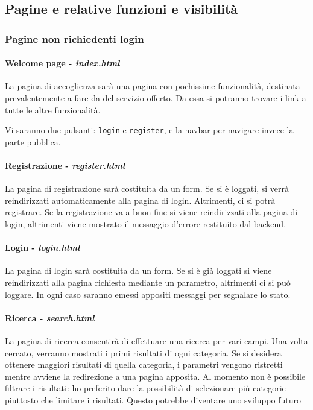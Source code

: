 \subsection{Pagine e relative funzioni e visibilità}
\subsubsection{Pagine non richiedenti login}
\paragraph{Welcome page - \textit{index.html}}
La pagina di accoglienza sarà una pagina con pochissime funzionalità, destinata prevalentemente a fare da  del servizio offerto. Da essa si potranno trovare i link a tutte le altre funzionalità.

Vi saranno due pulsanti: \verb|login| e \verb|register|, e la navbar per navigare invece la parte pubblica.

\paragraph{Registrazione - \textit{register.html}}
La pagina di registrazione sarà costituita da un form. Se si è loggati, si verrà reindirizzati automaticamente alla pagina di login. Altrimenti, ci si potrà registrare. Se la registrazione va a buon fine si viene reindirizzati alla pagina di login, altrimenti viene mostrato il messaggio d'errore restituito dal backend.

\paragraph{Login - \textit{login.html}}
La pagina di login sarà costituita da un form. Se si è già loggati si viene reindirizzati alla pagina richiesta mediante un parametro, altrimenti ci si può loggare. In ogni caso saranno emessi appositi messaggi per segnalare lo stato.

\paragraph{Ricerca - \textit{search.html}}
La pagina di ricerca consentirà di effettuare una ricerca per vari campi. Una volta cercato, verranno mostrati i primi risultati di ogni categoria. Se si desidera ottenere maggiori risultati di quella categoria, i parametri vengono ristretti mentre avviene la redirezione a una pagina apposita.
\alert{Al momento non è possibile filtrare i risultati: ho preferito dare la possibilità di selezionare più categorie piuttosto che limitare i risultati. Questo potrebbe diventare uno sviluppo futuro}
